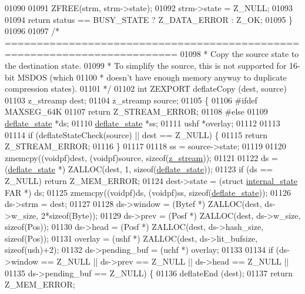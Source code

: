 \begin{DoxyCode}
{01090 
01091     ZFREE(strm, strm->state);
01092     strm->state = Z\_NULL;
01093 
01094     \textcolor{keywordflow}{return} status == BUSY\_STATE ? Z\_DATA\_ERROR : Z\_OK;
01095 \}
01096 
01097 \textcolor{comment}{/* =========================================================================}
01098 \textcolor{comment}{ * Copy the source state to the destination state.}
01099 \textcolor{comment}{ * To simplify the source, this is not supported for 16-bit MSDOS (which}
01100 \textcolor{comment}{ * doesn't have enough memory anyway to duplicate compression states).}
01101 \textcolor{comment}{ */}
01102 \textcolor{keywordtype}{int} ZEXPORT deflateCopy (dest, source)
01103     z\_streamp dest;
01104     z\_streamp source;
01105 \{
01106 \textcolor{preprocessor}{#ifdef MAXSEG\_64K}
01107     \textcolor{keywordflow}{return} Z\_STREAM\_ERROR;
01108 \textcolor{preprocessor}{#else}
01109     \hyperlink{structinternal__state}{deflate\_state} *ds;
01110     \hyperlink{structinternal__state}{deflate\_state} *ss;
01111     ushf *overlay;
01112 
01113 
01114     \textcolor{keywordflow}{if} (deflateStateCheck(source) || dest == Z\_NULL) \{
01115         \textcolor{keywordflow}{return} Z\_STREAM\_ERROR;
01116     \}
01117 
01118     ss = source->state;
01119 
01120     zmemcpy((voidpf)dest, (voidpf)source, \textcolor{keyword}{sizeof}(\hyperlink{structz__stream__s}{z\_stream}));
01121 
01122     ds = (\hyperlink{structinternal__state}{deflate\_state} *) ZALLOC(dest, 1, \textcolor{keyword}{sizeof}(\hyperlink{structinternal__state}{deflate\_state}));
01123     \textcolor{keywordflow}{if} (ds == Z\_NULL) \textcolor{keywordflow}{return} Z\_MEM\_ERROR;
01124     dest->state = (\textcolor{keyword}{struct }\hyperlink{structinternal__state}{internal\_state} FAR *) ds;
01125     zmemcpy((voidpf)ds, (voidpf)ss, \textcolor{keyword}{sizeof}(\hyperlink{structinternal__state}{deflate\_state}));
01126     ds->strm = dest;
01127 
01128     ds->window = (Bytef *) ZALLOC(dest, ds->w\_size, 2*\textcolor{keyword}{sizeof}(Byte));
01129     ds->prev   = (Posf *)  ZALLOC(dest, ds->w\_size, \textcolor{keyword}{sizeof}(Pos));
01130     ds->head   = (Posf *)  ZALLOC(dest, ds->hash\_size, \textcolor{keyword}{sizeof}(Pos));
01131     overlay = (ushf *) ZALLOC(dest, ds->lit\_bufsize, \textcolor{keyword}{sizeof}(ush)+2);
01132     ds->pending\_buf = (uchf *) overlay;
01133 
01134     \textcolor{keywordflow}{if} (ds->window == Z\_NULL || ds->prev == Z\_NULL || ds->head == Z\_NULL ||
01135         ds->pending\_buf == Z\_NULL) \{
01136         deflateEnd (dest);
01137         \textcolor{keywordflow}{return} Z\_MEM\_ERROR;
}
\end{DoxyCode}
